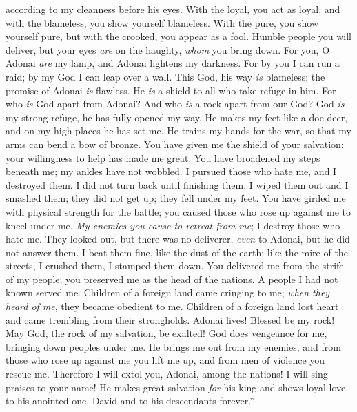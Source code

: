 \begin{biblechapter}
according to my cleanness before his eyes.
\verse With the loyal, you act as loyal, 
and with the blameless, you show yourself blameless.
\verse With the pure, you show yourself pure, 
but with the crooked, you appear as a fool.
\verse Humble people you will deliver, 
but your eyes \textit{are} on the haughty, \textit{whom} you bring down.
\verse For you, O Adonai \textit{are} my lamp, 
and Adonai lightens my darkness.
\verse For by you I can run a raid; 
by my God I can leap over a wall.
\verse This God, his way \textit{is} blameless; 
the promise of Adonai \textit{is} flawless. 
He \textit{is} a shield to all who take refuge in him.
\verse For who \textit{is} God apart from Adonai? 
And who \textit{is} a rock apart from our God?
\verse God \textit{is} my strong refuge, 
he has fully opened my way.
\verse He makes my feet like a doe deer, 
and on my high places he has set me.
\verse He trains my hands for the war, 
so that my arms can bend a bow of bronze.
\verse You have given me the shield of your salvation; 
your willingness to help has made me great.
\verse You have broadened my steps beneath me; 
my ankles have not wobbled.
\verse I pursued those who hate me, and I destroyed them. 
I did not turn back until finishing them.
\verse I wiped them out and I smashed them; 
they did not get up; they fell under my feet.
\verse You have girded me with physical strength for the battle; 
you caused those who rose up against me to kneel under me.
\verse \textit{My enemies you cause to retreat from me}; 
I destroy those who hate me.
\verse They looked out, but there was no deliverer, 
\textit{even} to Adonai, but he did not answer them.
\verse I beat them fine, like the dust of the earth; 
like the mire of the streets, I crushed them, I stamped them down.
\verse You delivered me from the strife of my people; 
you preserved me as the head of the nations. 
A people I had not known served me.
\verse Children of a foreign land came cringing to me; 
\textit{when they heard of me}, they became obedient to me.
\verse Children of a foreign land lost heart 
and came trembling from their strongholds.
\verse Adonai lives! Blessed be my rock! 
May God, the rock of my salvation, be exalted!
\verse God does vengeance for me, 
bringing down peoples under me.
\verse He brings me out from my enemies, 
and from those who rose up against me you lift me up, 
and from men of violence you rescue me.
\verse Therefore I will extol you, Adonai, among the nations! 
I will sing praises to your name!
\verse He makes great salvation \textit{for} his king 
and shows loyal love to his anointed one, David 
and to his descendants forever.”
\end{biblechapter}

